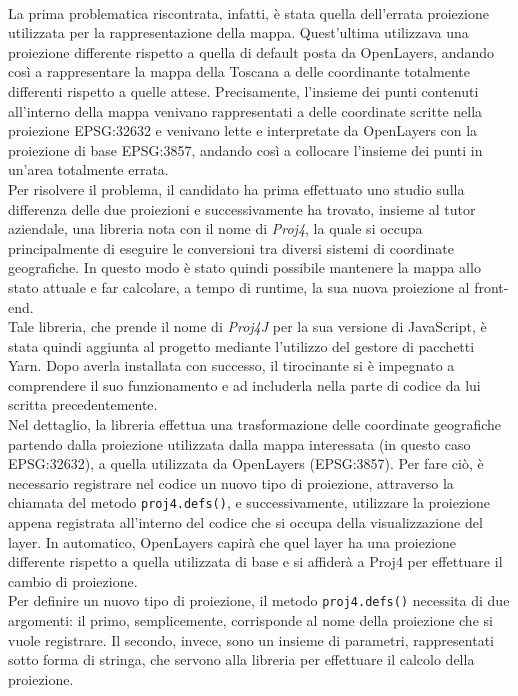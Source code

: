 \\La prima problematica riscontrata, infatti, è stata quella dell'errata proiezione utilizzata per la rappresentazione della mappa. Quest'ultima utilizzava una proiezione differente rispetto a quella di default posta da OpenLayers, andando così a rappresentare la mappa della Toscana a delle coordinante totalmente differenti rispetto a quelle attese. Precisamente, l'insieme dei punti contenuti all'interno della mappa venivano rappresentati a delle coordinate scritte nella proiezione EPSG:32632 e venivano lette e interpretate da OpenLayers con la proiezione di base EPSG:3857, andando così a collocare l'insieme dei punti in un'area totalmente errata.
\\Per risolvere il problema, il candidato ha prima effettuato uno studio sulla differenza delle due proiezioni e successivamente ha trovato, insieme al tutor aziendale, una libreria nota con il nome di \textit{Proj4}, la quale si occupa principalmente di eseguire le conversioni tra diversi sistemi di coordinate geografiche. In questo modo è stato quindi possibile mantenere la mappa allo stato attuale e far calcolare, a tempo di runtime, la sua nuova proiezione al front-end.
\\Tale libreria, che prende il nome di \textit{Proj4J} per la sua versione di JavaScript, è stata quindi aggiunta al progetto mediante l'utilizzo del gestore di pacchetti Yarn. Dopo averla installata con successo, il tirocinante si è impegnato a comprendere il suo funzionamento e ad includerla nella parte di codice da lui scritta precedentemente. 
\medskip
\\Nel dettaglio, la libreria effettua una trasformazione delle coordinate geografiche partendo dalla proiezione utilizzata dalla mappa interessata (in questo caso EPSG:32632), a quella utilizzata da OpenLayers (EPSG:3857). Per fare ciò, è necessario registrare nel codice un nuovo tipo di proiezione, attraverso la chiamata del metodo \verb|proj4.defs()|, e successivamente, utilizzare la proiezione appena registrata all'interno del codice che si occupa della visualizzazione del layer. In automatico, OpenLayers capirà che quel layer ha una proiezione differente rispetto a quella utilizzata di base e si affiderà a Proj4 per effettuare il cambio di proiezione. 
\\Per definire un nuovo tipo di proiezione, il metodo \verb|proj4.defs()| necessita di due argomenti: il primo, semplicemente, corrisponde al nome della proiezione che si vuole registrare. Il secondo, invece, sono un insieme di parametri, rappresentati sotto forma di stringa, che servono alla libreria per effettuare il calcolo della proiezione. 
